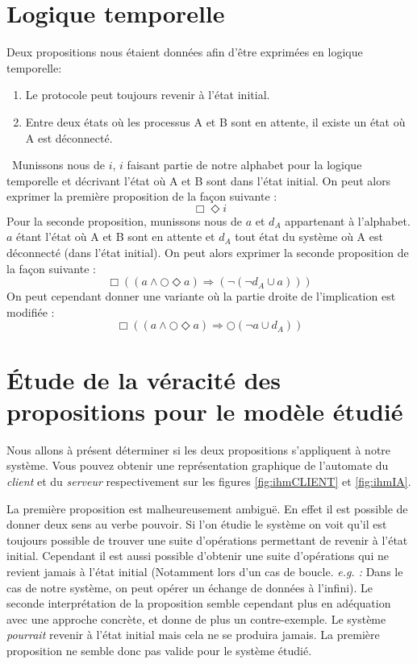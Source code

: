  
 
 
\section{Logique temporelle}

Deux propositions nous étaient données afin d'être exprimées en logique temporelle:
\begin{enumerate}
 \item Le protocole peut toujours revenir à l’état initial.
 \item Entre deux états où les processus A et B sont en attente, il existe un état où A est déconnecté.
\end{enumerate}
\
Munissons nous de $i$, $i$ faisant partie de notre alphabet pour la logique temporelle et décrivant l'état où A et B sont dans l'état initial. On peut alors exprimer la première proposition de la façon suivante :
\begin{equation}
 \Box\Diamond i
\end{equation}
Pour la seconde proposition, munissons nous de $a$ et $d_A$ appartenant à l'alphabet. $a$ étant l'état où A et B sont en attente et $d_A$ tout état du système où A est déconnecté (dans l'état initial). On peut alors exprimer la seconde proposition de la façon suivante :
\begin{equation}
 \Box((a\wedge\bigcirc\Diamond a)\Longrightarrow(\neg(\neg d_A\cup a)))
\end{equation}
On peut cependant donner une variante où la partie droite de l'implication est modifiée :
\begin{equation}
 \Box((a\wedge\bigcirc\Diamond a)\Longrightarrow\bigcirc(\neg a\cup d_A))
\end{equation}




\section{Étude de la véracité des propositions pour le modèle étudié}
Nous allons à présent déterminer si les deux propositions s'appliquent à notre système. Vous pouvez obtenir une représentation graphique de l'automate du \emph{client} et du \emph{serveur} respectivement sur les figures \ref{fig:ihmCLIENT} et \ref{fig:ihmIA}.

La première proposition est malheureusement ambiguë. En effet il est possible de donner deux sens au verbe \og pouvoir\fg . Si l'on étudie le système on voit qu'il est toujours possible de trouver une suite d'opérations permettant de revenir à l'état initial. Cependant il est aussi possible d'obtenir une suite d'opérations qui ne revient jamais à l'état initial (Notamment lors d'un cas de boucle. \emph{e.g. :} Dans le cas de notre système, on peut opérer un échange de données à l'infini).
Le seconde interprétation de la proposition semble cependant plus en adéquation avec une approche concrète, et donne de plus un contre-exemple. Le système \emph{pourrait} revenir à l'état initial mais cela ne se produira jamais. La première proposition ne semble donc pas valide pour le système étudié.

